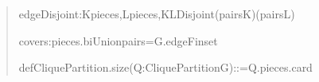 \documentclass[spanish,11pt,a4paper]{article}
\newlength{\LeanCharWidth}
\begin{document}
\begin{quote}
\noindent \hspace*{\dimexpr 2\LeanCharWidth\relax}edgeDisjoint\hspace*{\dimexpr 1\LeanCharWidth\relax}:\hspace*{\dimexpr 1\LeanCharWidth\relax}{\LeanSymbols ∀}\hspace*{\dimexpr 1\LeanCharWidth\relax}K\hspace*{\dimexpr 1\LeanCharWidth\relax}{\LeanSymbols ∈}\hspace*{\dimexpr 1\LeanCharWidth\relax}pieces,\hspace*{\dimexpr 1\LeanCharWidth\relax}{\LeanSymbols ∀}\hspace*{\dimexpr 1\LeanCharWidth\relax}L\hspace*{\dimexpr 1\LeanCharWidth\relax}{\LeanSymbols ∈}\hspace*{\dimexpr 1\LeanCharWidth\relax}pieces,\hspace*{\dimexpr 1\LeanCharWidth\relax}K\hspace*{\dimexpr 1\LeanCharWidth\relax}{\LeanSymbols ≠}\hspace*{\dimexpr 1\LeanCharWidth\relax}L\hspace*{\dimexpr 1\LeanCharWidth\relax}{\LeanSymbols →}\hspace*{\dimexpr 1\LeanCharWidth\relax}Disjoint\hspace*{\dimexpr 1\LeanCharWidth\relax}(pairs\hspace*{\dimexpr 1\LeanCharWidth\relax}K)\hspace*{\dimexpr 1\LeanCharWidth\relax}(pairs\hspace*{\dimexpr 1\LeanCharWidth\relax}L)\par
\noindent \hspace*{\dimexpr 2\LeanCharWidth\relax}covers\hspace*{\dimexpr 1\LeanCharWidth\relax}:\hspace*{\dimexpr 1\LeanCharWidth\relax}pieces.biUnion\hspace*{\dimexpr 1\LeanCharWidth\relax}pairs\hspace*{\dimexpr 1\LeanCharWidth\relax}=\hspace*{\dimexpr 1\LeanCharWidth\relax}G.edgeFinset\par
\noindent \strut\par
\noindent def\hspace*{\dimexpr 1\LeanCharWidth\relax}CliquePartition.size\hspace*{\dimexpr 1\LeanCharWidth\relax}(Q\hspace*{\dimexpr 1\LeanCharWidth\relax}:\hspace*{\dimexpr 1\LeanCharWidth\relax}CliquePartition\hspace*{\dimexpr 1\LeanCharWidth\relax}G)\hspace*{\dimexpr 1\LeanCharWidth\relax}:\hspace*{\dimexpr 1\LeanCharWidth\relax}{\LeanSymbols ℕ}\hspace*{\dimexpr 1\LeanCharWidth\relax}:=\hspace*{\dimexpr 1\LeanCharWidth\relax}Q.pieces.card\par

\end{quote}
\end{document}
